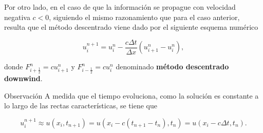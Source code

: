 \begin{frame}
    \frametitle{\subsecname}

    Por otro lado, en el caso de que la información se propague con
    velocidad negativa $c<0$, %
    siguiendo el mismo razonamiento que para el caso anterior, resulta
    que el método descentrado viene dado por el siguiente esquema
    numérico

    \begin{equation}\label{eq:downwind}
        u^{n+1}_{i}=
        u^{n}_{i}-
        \frac{c\Delta t}{\Delta x}
        \left(
        u^{n}_{i+1}-
        u^{n}_{i}
        \right),
    \end{equation}

    donde
    \begin{math}
        F^{n}_{i+\frac{1}{2}}=
        cu^{n}_{i+1}
    \end{math}
    y
    \begin{math}
        F^{n}_{i-\frac{1}{2}}=
        cu^{n}_{i}
    \end{math}
    denominado \textbf{método descentrado downwind}.

    \begin{alertblock}{Observación}
        A medida que el tiempo evoluciona, como la solución es constante a lo
        largo de las rectas características, se tiene que

        \begin{equation*}
            u^{n+1}_{i}\approx
            u
            \left(x_{i},t_{n+1}\right)=
            u
            \left(
            x_{i}-
            c\left(t_{n+1}-t_{n}\right),
            t_{n}
            \right)=
            u
            \left(
            x_{i}-
            c\Delta t,t_{n}
            \right).
        \end{equation*}
    \end{alertblock}
\end{frame}
